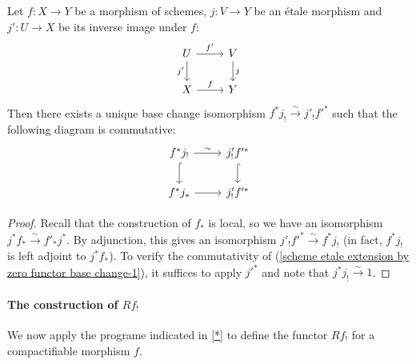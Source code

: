 \begin{proposition}\label{scheme etale extension by zero functor base change}
Let $f:X\to Y$ be a morphism of schemes, $j:V\to Y$ be an \'etale morphism and $j':U\to X$ be its inverse image under $f$:
\[\begin{tikzcd}
U\ar[r,"f'"]\ar[d,swap,"j'"]&V\ar[d,"j"]\\
X\ar[r,"f"]&Y
\end{tikzcd}\]
Then there exists a unique base change isomorphism $f^*j_!\stackrel{\sim}{\to}j'_!f'^*$ such that the following diagram is commutative:
\begin{equation}\label{scheme etale extension by zero functor base change-1}
\begin{tikzcd}
f^*j_!\ar[r,"\sim"]\ar[d,hook]&j'_!f'^*\ar[d,hook]\\
f^*j_*\ar[r]&j'_!f'^*
\end{tikzcd}
\end{equation}
\end{proposition}
\begin{proof}
Recall that the construction of $f_*$ is local, so we have an isomorphism $j^*f_*\stackrel{\sim}{\to}f'_*j^*$. By adjunction, this gives an isomorphism $j'_!f'^*\stackrel{\sim}{\to}f^*j_!$ (in fact, $f^*j_!$ is left adjoint to $j^*f_*$). To verify the commutativity of (\ref{scheme etale extension by zero functor base change-1}), it suffices to apply $j'^*$ and note that $j^*j_!\stackrel{\sim}{\to}1$.
\end{proof}

\paragraph{The construction of \texorpdfstring{$Rf_!$}{f}}
We now apply the programe indicated in \autoref{*} to define the functor $Rf_!$ for a compactifiable morphism $f$. 

